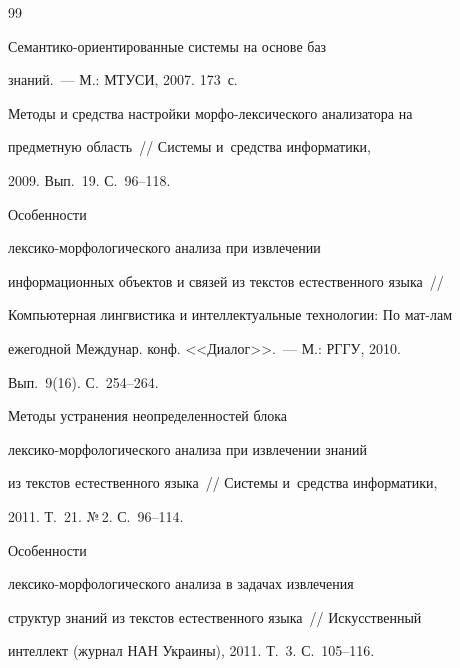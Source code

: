 {{\begin{thebibliography}{99}


    Се\-ман\-ти\-ко-ори\-ен\-ти\-ро\-ван\-ные сис\-те\-мы на основе баз

знаний.~--- М.: МТУСИ, 2007. 173~с.



Методы и средства настройки мор\-фо-лек\-си\-че\-ско\-го анализатора на

предметную область~/\!\!/ Системы и~средства информатики,

2009. Вып.~19. С.~96--118.




     Особенности

    лек\-си\-ко-мор\-фо\-ло\-ги\-че\-ско\-го анализа при извлечении

информационных объектов и связей из текстов естественного языка~/\!\!/

Компьютерная лингвистика и интеллектуальные технологии: По мат-лам

ежегодной Междунар. конф. <<Диалог>>.~---  М.: РГГУ, 2010.

    Вып.~9(16). С.~254--264.


     Методы устранения неопределенностей блока

    лек\-си\-ко-мор\-фо\-ло\-ги\-че\-ско\-го анализа при извлечении знаний

из текстов естественного языка~/\!\!/ Системы и~средства информатики,

2011. Т.~21. №\,2. С.~96--114.




     Особенности

лек\-си\-ко-мор\-фо\-ло\-ги\-че\-ско\-го анализа в задачах извлечения

структур знаний из текстов естественного языка~/\!\!/ Искусственный

интеллект (журнал НАН Украины), 2011. Т.~3. С.~105--116.




\end{thebibliography}}}
